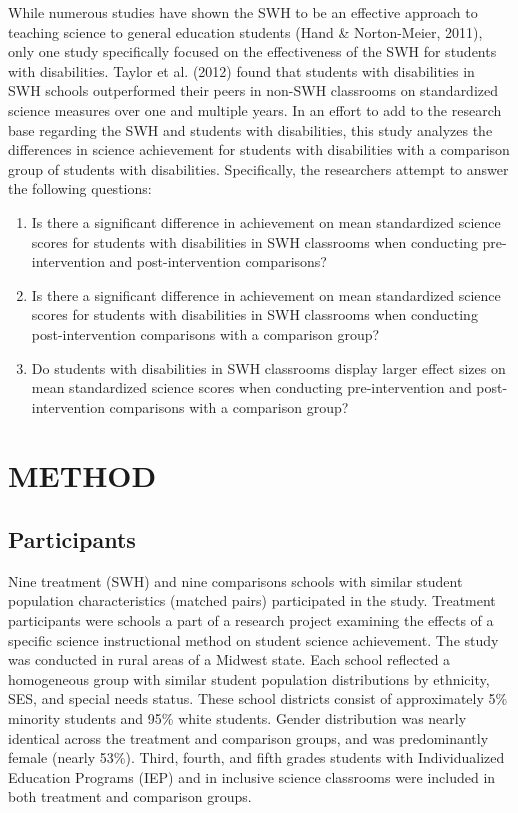 \documentclass[11.5pt]{sig-alternate} %
\begin{document}
\begin{large}
While numerous studies have shown the SWH to be an effective approach to teaching science to general education students (Hand \& Norton-Meier, 2011), only one study specifically focused on the effectiveness of the SWH for students with disabilities.  Taylor et al. (2012) found that students with disabilities in SWH schools outperformed their peers in non-SWH classrooms on standardized science measures over one and multiple years.  In an effort to add to the research base regarding the SWH and students with disabilities, this study analyzes the differences in science achievement for students with disabilities with a comparison group of students with disabilities. Specifically, the researchers attempt to answer the following questions:
\begin{enumerate}
    \item Is there a significant difference in achievement on mean standardized science scores for students with disabilities in SWH classrooms when conducting pre-intervention and post-intervention comparisons?
    \item Is there a significant difference in achievement on mean standardized science scores for students with disabilities in SWH classrooms when conducting post-intervention comparisons with a comparison group?
    \item Do students with disabilities in SWH classrooms display larger effect sizes on mean standardized science scores when conducting pre-intervention and post-intervention comparisons with a comparison group?
\end{enumerate}

\section*{METHOD}

\subsection*{Participants}

Nine treatment (SWH) and nine comparisons schools with similar student population characteristics (matched pairs) participated in the study.  Treatment participants were schools a part of a research project examining the effects of a specific science instructional method on student science achievement.  The study was conducted in rural areas of a Midwest state.   Each school reflected a homogeneous group with similar student population distributions by ethnicity, SES, and special needs status.  These school districts consist of approximately 5\% minority students and 95\% white students. Gender distribution was nearly identical across the treatment and comparison groups, and was predominantly female (nearly 53\%). Third, fourth, and fifth grades students with Individualized Education Programs (IEP) and in inclusive science classrooms were included in both treatment and comparison groups.


\end{large}
\end{document}
